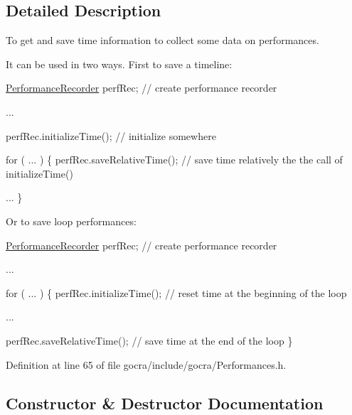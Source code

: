 \subsection{Detailed Description}
To get and save time information to collect some data on performances. 

It can be used in two ways. First to save a timeline\+:


\begin{DoxyCode}
\hyperlink{classgocra_1_1PerformanceRecorder_a65ac4c19828090b5c20b15d17cec3cd6}{PerformanceRecorder}     perfRec;    \textcolor{comment}{// create performance recorder}

...

perfRec.initializeTime();             \textcolor{comment}{// initialize somewhere}

\textcolor{keywordflow}{for} ( ... )
\{
    perfRec.saveRelativeTime();       \textcolor{comment}{// save time relatively the the call of initializeTime()}

    ...
\}
\end{DoxyCode}


Or to save loop performances\+:


\begin{DoxyCode}
\hyperlink{classgocra_1_1PerformanceRecorder_a65ac4c19828090b5c20b15d17cec3cd6}{PerformanceRecorder}     perfRec;    \textcolor{comment}{// create performance recorder}

...

for ( ... )
\{
    perfRec.initializeTime();       \textcolor{comment}{// reset time at the beginning of the loop}

    ...

    perfRec.saveRelativeTime();     \textcolor{comment}{// save time at the end of the loop}
\}
\end{DoxyCode}
 

Definition at line 65 of file gocra/include/gocra/\+Performances.\+h.



\subsection{Constructor \& Destructor Documentation}
\hypertarget{classgocra_1_1PerformanceRecorder_a65ac4c19828090b5c20b15d17cec3cd6}{}\label{classgocra_1_1PerformanceRecorder_a65ac4c19828090b5c20b15d17cec3cd6} 
